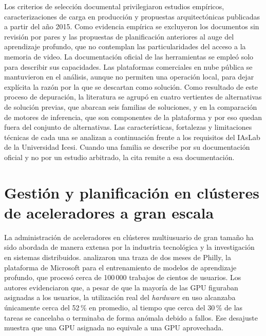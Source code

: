 Los criterios de selección documental privilegiaron estudios empíricos, caracterizaciones de carga en producción y propuestas arquitectónicas publicadas a partir del año 2015. Como evidencia empírica se excluyeron los documentos sin revisión por pares y las propuestas de planificación anteriores al auge del aprendizaje profundo, que no contemplan las particularidades del acceso a la memoria de video. La documentación oficial de las herramientas se empleó solo para describir sus capacidades. Las plataformas comerciales en nube pública se mantuvieron en el análisis, aunque no permiten una operación local, para dejar explícita la razón por la que se descartan como solución. Como resultado de este proceso de depuración, la literatura se agrupó en cuatro vertientes de alternativas de solución previas, que abarcan seis familias de soluciones, y en la comparación de motores de inferencia, que son componentes de la plataforma y por eso quedan fuera del conjunto de alternativas. Las características, fortalezas y limitaciones técnicas de cada una se analizan a continuación frente a los requisitos del IAsLab de la Universidad Icesi. Cuando una familia se describe por su documentación oficial y no por un estudio arbitrado, la cita remite a esa documentación.

\section{Gestión y planificación en clústeres de aceleradores a gran escala}\label{sec:clusteres-industriales}

La administración de aceleradores en clústeres multiusuario de gran tamaño ha sido abordada de manera extensa por la industria tecnológica y la investigación en sistemas distribuidos. \citet{jeon-philly-2019} analizaron una traza de dos meses de Philly, la plataforma de Microsoft para el entrenamiento de modelos de aprendizaje profundo, que procesó cerca de 100\,000 trabajos de cientos de usuarios. Los autores evidenciaron que, a pesar de que la mayoría de las GPU figuraban asignadas a los usuarios, la utilización real del \emph{hardware} en uso alcanzaba únicamente cerca del 52\,\% en promedio, al tiempo que cerca del 30\,\% de las tareas se cancelaba o terminaba de forma anómala debido a fallos. Ese desajuste muestra que una GPU asignada no equivale a una GPU aprovechada.

